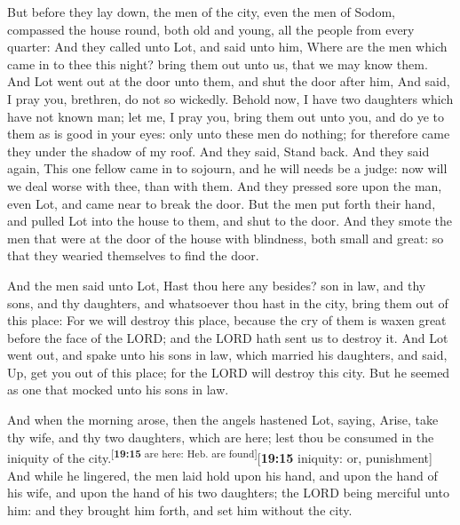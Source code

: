  But before they lay down, the men of the city, even the
men of Sodom, compassed the house round, both old and young, all the
people from every quarter:  And they called unto Lot, and
said unto him, Where are the men which came in to thee this night? bring
them out unto us, that we may know them.  And Lot went out
at the door unto them, and shut the door after him,  And
said, I pray you, brethren, do not so wickedly.  Behold
now, I have two daughters which have not known man; let me, I pray you,
bring them out unto you, and do ye to them as is good in your eyes: only
unto these men do nothing; for therefore came they under the shadow of
my roof.  And they said, Stand back. And they said again,
This one fellow came in to sojourn, and he will needs be a judge: now
will we deal worse with thee, than with them. And they pressed sore upon
the man, even Lot, and came near to break the door.  But
the men put forth their hand, and pulled Lot into the house to them, and
shut to the door.  And they smote the men that were at
the door of the house with blindness, both small and great: so that they
wearied themselves to find the door.

 And the men said unto Lot, Hast thou here any besides?
son in law, and thy sons, and thy daughters, and whatsoever thou hast in
the city, bring them out of this place:  For we will
destroy this place, because the cry of them is waxen great before the
face of the LORD; and the LORD hath sent us to destroy it.
 And Lot went out, and spake unto his sons in law, which
married his daughters, and said, Up, get you out of this place; for the
LORD will destroy this city. But he seemed as one that mocked unto his
sons in law.

 And when the morning arose, then the angels hastened
Lot, saying, Arise, take thy wife, and thy two daughters, which are
here; lest thou be consumed in the iniquity of the
city.\textsuperscript{{[}\textbf{19:15} are here: Heb. are
found{]}}{[}\textbf{19:15} iniquity: or, punishment{]} 
And while he lingered, the men laid hold upon his hand, and upon the
hand of his wife, and upon the hand of his two daughters; the LORD being
merciful unto him: and they brought him forth, and set him without the
city.

